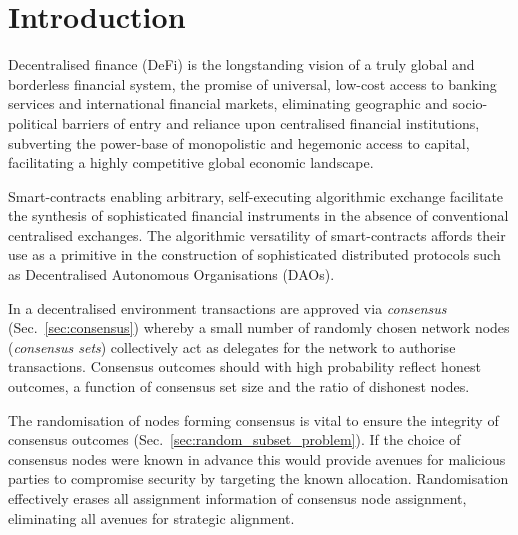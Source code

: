 \documentclass[twocolumn, aps, amsmath, amssymb, nofootinbib, superscriptaddress, longbibliography, floatfix, eqsecnum, rmp]{revtex4-2}
\begin{document}
\tableofcontents

\section{Introduction}

Decentralised finance (DeFi) is the longstanding vision of a truly global and borderless financial system, the promise of universal, low-cost access to banking services and international financial markets, eliminating geographic and socio-political barriers of entry and reliance upon centralised financial institutions, subverting the power-base of monopolistic and hegemonic access to capital, facilitating a highly competitive global economic landscape.

Smart-contracts enabling arbitrary, self-executing algorithmic exchange facilitate the synthesis of sophisticated financial instruments in the absence of conventional centralised exchanges. The algorithmic versatility of smart-contracts affords their use as a primitive in the construction of sophisticated distributed protocols such as Decentralised Autonomous Organisations (DAOs).


In a decentralised environment transactions are approved via \emph{consensus} (Sec.~\ref{sec:consensus}) whereby a small number of randomly chosen network nodes (\emph{consensus sets}) collectively act as delegates for the network to authorise transactions. Consensus outcomes should with high probability reflect honest outcomes, a function of consensus set size and the ratio of dishonest nodes.

The randomisation of nodes forming consensus is vital to ensure the integrity of consensus outcomes (Sec.~\ref{sec:random_subset_problem}). If the choice of consensus nodes were known in advance this would provide avenues for malicious parties to compromise security by targeting the known allocation. Randomisation effectively erases all assignment information of consensus node assignment, eliminating all avenues for strategic alignment.
\end{document}
